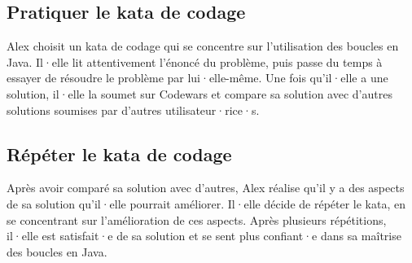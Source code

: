 \subsection{Pratiquer le kata de codage}

Alex choisit un kata de codage qui se concentre sur l'utilisation des boucles en Java. Il·elle lit attentivement l'énoncé du problème, puis passe du temps à essayer de résoudre le problème par lui·elle-même. Une fois qu'il·elle a une solution, il·elle la soumet sur Codewars et compare sa solution avec d'autres solutions soumises par d'autres utilisateur·rice·s.

\subsection{Répéter le kata de codage}

Après avoir comparé sa solution avec d'autres, Alex réalise qu'il y a des aspects de sa solution qu'il·elle pourrait améliorer. Il·elle décide de répéter le kata, en se concentrant sur l'amélioration de ces aspects. Après plusieurs répétitions, il·elle est satisfait·e de sa solution et se sent plus confiant·e dans sa maîtrise des boucles en Java.



